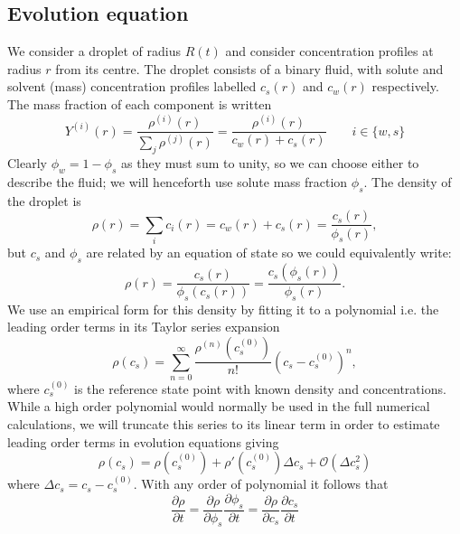 \documentclass[12pt]{report}
\begin{document}
\subsection{Evolution equation}

We consider a droplet of radius $R(t)$ and consider concentration profiles at radius $r$ from its centre.
The droplet consists of a binary fluid, with solute and solvent (mass) concentration profiles labelled $c_s(r)$ and $c_w(r)$ respectively.
The mass fraction of each component is written
\begin{equation}\label{eq:mass-fraction}
  Y^{(i)}(r) = \frac{\rho^{(i)}(r)}{\sum_j \rho^{(j)}(r)} = \frac{\rho^{(i)}(r)}{c_w(r) + c_s(r)} \qquad i \in \{w,s\}
\end{equation}
Clearly $\phi_w = 1 - \phi_s$ as they must sum to unity, so we can choose either to describe the fluid;
we will henceforth use solute mass fraction $\phi_s$.
The density of the droplet is
\begin{equation}
  \rho(r) = \sum_i c_i(r) = c_w(r) + c_s(r) = \frac{c_s(r)}{\phi_s(r)},
\end{equation}
but $c_s$ and $\phi_s$ are related by an equation of state so we could equivalently write:
\begin{equation}
  \rho(r) = \frac{c_s(r)}{\phi_s(c_s(r))} = \frac{c_s(\phi_s(r))}{\phi_s(r)}.
\end{equation}
We use an empirical form for this density by fitting it to a polynomial i.e. the leading order terms in its Taylor series expansion
\begin{equation}
  \rho(c_s) = \sum_{n=0}^{\infty} \frac{\rho^{(n)}(c_s^{(0)})}{n!} (c_s - c_s^{(0)})^n,
\end{equation}
where $c_s^{(0)}$ is the reference state point with known density and concentrations.
While a high order polynomial would normally be used in the full numerical calculations, we will truncate this series to its linear term in order to estimate leading order terms in evolution equations giving
\begin{equation}\label{eq:density-expansion}
  \rho(c_s) = \rho(c_s^{(0)}) + \rho'(c_s^{(0)}) \Delta c_s + \mathcal{O}(\Delta c_s^2)
\end{equation}
where $\Delta c_s = c_s - c_s^{(0)}$.
With any order of polynomial it follows that
\begin{equation}\label{eq:linear-density-regime}
  \frac{\partial \rho}{\partial t}
  = \frac{\partial \rho}{\partial \phi_s} \frac{\partial \phi_s}{\partial t}
  = \frac{\partial \rho}{\partial c_s} \frac{\partial c_s}{\partial t}
\end{equation}
\end{document}
